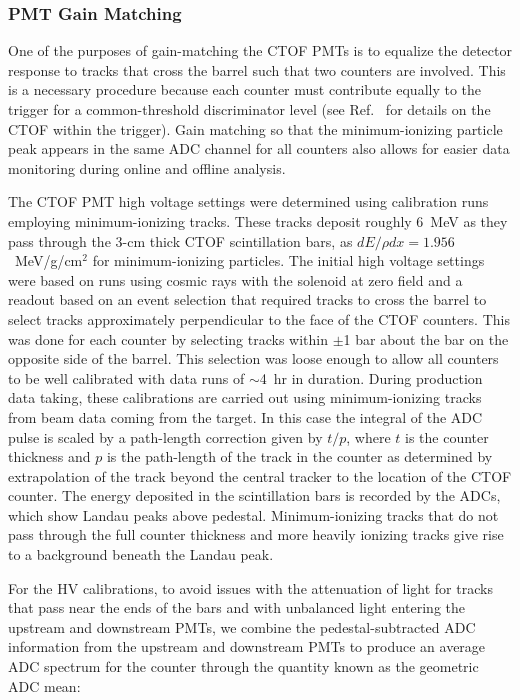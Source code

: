 \documentclass[3p,times,twocolumn]{elsarticle}
\begin{document}
\subsubsection{PMT Gain Matching}
\label{gain-matching}

One of the purposes of gain-matching the CTOF PMTs is to equalize the detector response to tracks that
cross the barrel such that two counters are involved. This is a necessary procedure because each counter
must contribute equally to the trigger for a common-threshold discriminator level (see Ref.~\cite{trigger-nim}
for details on the CTOF within the trigger). Gain matching so that the minimum-ionizing particle peak appears
in the same ADC channel for all counters also allows for easier data monitoring during online and offline analysis.

The CTOF PMT high voltage settings were determined using calibration runs employing minimum-ionizing
tracks. These tracks deposit roughly 6~MeV as they pass through the 3-cm thick CTOF scintillation bars,
as $dE/\rho dx = 1.956$~MeV/g/cm$^2$ for minimum-ionizing particles. The initial high voltage settings
were based on runs using cosmic rays with the solenoid at zero field and a readout based on an event
selection that required tracks to cross the barrel to select tracks approximately perpendicular to the
face of the CTOF counters. This was done for each counter by selecting tracks within $\pm$1 bar about
the bar on the opposite side of the barrel. This selection was loose enough to allow all counters to be well
calibrated with data runs of $\sim$4~hr in duration. During production data taking, these calibrations are
carried out using minimum-ionizing tracks from beam data coming from the target. In this case the integral
of the ADC pulse is scaled by a path-length correction given by $t/p$, where $t$ is the counter thickness
and $p$ is the path-length of the track in the counter as determined by extrapolation of the track beyond
the central tracker to the location of the CTOF counter. The energy deposited in the scintillation bars is
recorded by the ADCs, which show Landau peaks above pedestal. Minimum-ionizing tracks that do not pass
through the full counter thickness and more heavily ionizing tracks give rise to a background beneath the
Landau peak.

For the HV calibrations, to avoid issues with the attenuation of light for tracks that pass near the ends of
the bars and with unbalanced light entering the upstream and downstream PMTs, we combine the
pedestal-subtracted ADC information from the upstream and downstream PMTs to produce an average
ADC spectrum for the counter through the quantity known as the geometric ADC mean:
\end{document}
